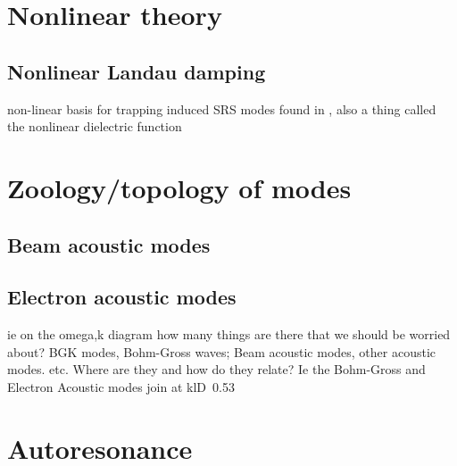 \section{Nonlinear theory}
\subsection{Nonlinear Landau damping}
non-linear basis for trapping induced SRS modes found in \cite{Rose2001}, also
 a thing called the nonlinear dielectric function



\section{Zoology/topology of modes}
\subsection{Beam acoustic modes}
\subsection{Electron acoustic modes}
ie on the omega,k diagram how many things are there that we should be worried
about? BGK modes, Bohm-Gross waves; Beam acoustic modes, other acoustic modes.
etc. Where are they and how do they relate? Ie the Bohm-Gross and Electron
Acoustic modes join at klD~0.53

\section{Autoresonance}
